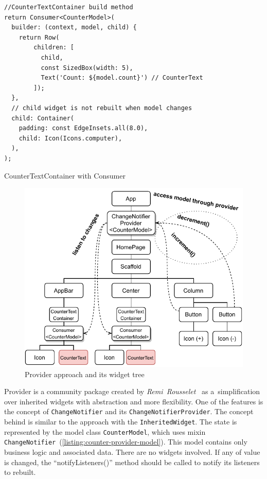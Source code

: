 \begin{listing}[ht]
\begin{verbatim}
//CounterTextContainer build method
return Consumer<CounterModel>(
  builder: (context, model, child) {
    return Row(
        children: [
          child,
          const SizedBox(width: 5),
          Text('Count: ${model.count}') // CounterText
        ]);
  },
  // child widget is not rebuilt when model changes
  child: Container(
    padding: const EdgeInsets.all(8.0),
    child: Icon(Icons.computer),
  ),
);
\end{verbatim}
\caption{CounterTextContainer with Consumer}
\label{listing:counter-provider-consumer}
\end{listing}

\begin{figure}[ht]
    \centering
    \includegraphics[width=0.75\linewidth]{img/flutter/counter-provider.pdf}
    \caption{Provider approach and its widget tree}
    \label{fig:counter-app-provider}
\end{figure}

Provider is a community package created by \textit{Remi~Rousselet}~\cite{package-provider} as a~simplification over inherited widgets with abstraction and more flexibility. One of the features is the concept of \verb|ChangeNotifier| and its \verb|ChangeNotifierProvider|. The concept behind is similar to the approach with the \verb|InheritedWidget|. The state is represented by the model class \verb|CounterModel|, which uses mixin \verb|ChangeNotifier|~(\cref{listing:counter-provider-model}). This model contains only business logic and associated data. There are no widgets involved. If any of value is changed, the ``notifyListeners()'' method should be called to notify its listeners to rebuilt.

